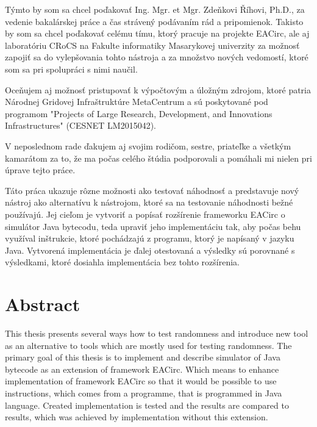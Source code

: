 \documentclass[12pt,twoside]{fithesis2}
\renewcommand{\_}{\leavevmode \kern0.0em\vbox{\hrule width0.4em}}
\begin{document}
\FrontMatter
\ThesisTitlePage

\newpage\null\thispagestyle{empty}\newpage
\begin{ThesisDeclaration}
\DeclarationText
\AdvisorName
\end{ThesisDeclaration}
\newpage\null\thispagestyle{empty}\newpage

\begin{ThesisThanks}
Týmto by som sa chcel poďakovať Ing. Mgr. et Mgr. Zdeňkovi Říhovi, Ph.D., za vedenie bakalárskej práce a čas strávený podávaním rád a pripomienok. Takisto by som sa chcel poďakovať celému tímu, ktorý pracuje na projekte EACirc, ale aj laboratóriu CRoCS na Fakulte informatiky Masarykovej univerzity za možnosť zapojiť sa do vylepšovania tohto nástroja a za množstvo nových vedomostí, ktoré som sa pri spolupráci s nimi naučil. 

Oceňujem aj možnosť pristupovať k výpočtovým a úložným zdrojom, ktoré patria Národnej Gridovej Infraštruktúre MetaCentrum a sú poskytované pod programom "Projects of Large Research, Development, and Innovations Infrastructures" (CESNET LM2015042).

V neposlednom rade ďakujem aj svojim rodičom, sestre, priateľke a všetkým kamarátom za to, že ma počas celého štúdia podporovali a pomáhali mi nielen pri úprave tejto práce.

\end{ThesisThanks}
\newpage\null\thispagestyle{empty}\newpage

\begin{ThesisAbstract}
Táto práca ukazuje rôzne možnosti ako testovať náhodnosť a predstavuje nový nástroj ako alternatívu k nástrojom, ktoré sa na testovanie náhodnosti bežné používajú. Jej cieľom je vytvoriť a popísať rozšírenie frameworku EACirc o simulátor Java bytecodu, teda upraviť jeho implementáciu tak, aby počas behu využíval inštrukcie, ktoré pochádzajú z programu, ktorý je napísaný v jazyku Java. Vytvorená implementácia je ďalej otestovaná a výsledky sú porovnané s výsledkami, ktoré dosiahla implementácia bez tohto rozšírenia.  
\end{ThesisAbstract}
\newpage\null\thispagestyle{empty}\newpage

\chapter*{Abstract}
This thesis presents several ways how to test randomness and introduce new tool as an alternative to tools which are mostly used for testing randomness.  The primary goal of this thesis is to implement and describe simulator of Java bytecode as an extension of framework EACirc. Which means to enhance implementation of framework EACirc so that it would be possible to use instructions, which comes from a programme, that is programmed in Java language.  Created implementation is tested and the results are compared to results, which was achieved by implementation without this extension.
\end{document}
